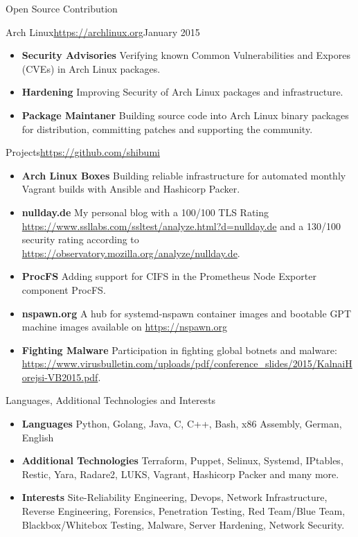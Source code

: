 \documentclass[]{mcdowellcv}
\begin{document}
\begin{cvsection}{Open Source Contribution}
\begin{cvsubsection}{Arch Linux}{\url{https://archlinux.org}}{January 2015}
\begin{itemize}
\item \textbf{Security Advisories} Verifying known Common Vulnerabilities and Expores (CVEs) in Arch Linux packages.
\item \textbf{Hardening} Improving Security of Arch Linux packages and infrastructure.
\item \textbf{Package Maintaner} Building source code into Arch Linux binary packages for distribution, committing patches and supporting the community.
\end{itemize}
\end{cvsubsection}

\begin{cvsubsection}{Projects}{\url{https://github.com/shibumi}}{}
\begin{itemize}
\item \textbf{Arch Linux Boxes} Building reliable infrastructure for automated monthly Vagrant builds with Ansible and Hashicorp Packer.
\item \textbf{nullday.de} My personal blog with a 100/100 TLS Rating \url{https://www.ssllabs.com/ssltest/analyze.html?d=nullday.de} and a 130/100 security rating according to \url{https://observatory.mozilla.org/analyze/nullday.de}.
\item \textbf{ProcFS} Adding support for CIFS in the Prometheus Node Exporter component ProcFS.
\item \textbf{nspawn.org} A hub for systemd-nspawn container images and bootable GPT machine images available on \url{https://nspawn.org}
\item \textbf{Fighting Malware} Participation in fighting global botnets and malware: \url{https://www.virusbulletin.com/uploads/pdf/conference_slides/2015/KalnaiHorejsi-VB2015.pdf}.
\end{itemize}
\end{cvsubsection}
\end{cvsection}

\begin{cvsection}{Languages, Additional Technologies and Interests}
\begin{cvsubsection}{}{}{}
\begin{itemize}
\item \textbf{Languages} Python, Golang, Java, C, C++, Bash, x86 Assembly, German, English
\item \textbf{Additional Technologies} Terraform, Puppet, Selinux, Systemd, IPtables, Restic, Yara, Radare2, LUKS, Vagrant, Hashicorp Packer and many more.
\item \textbf{Interests} Site-Reliability Engineering, Devops, Network Infrastructure, Reverse Engineering, Forensics, Penetration Testing, Red Team/Blue Team, Blackbox/Whitebox Testing, Malware, Server Hardening, Network Security.
\end{itemize}
\end{cvsubsection}
\end{cvsection}
\end{document}
